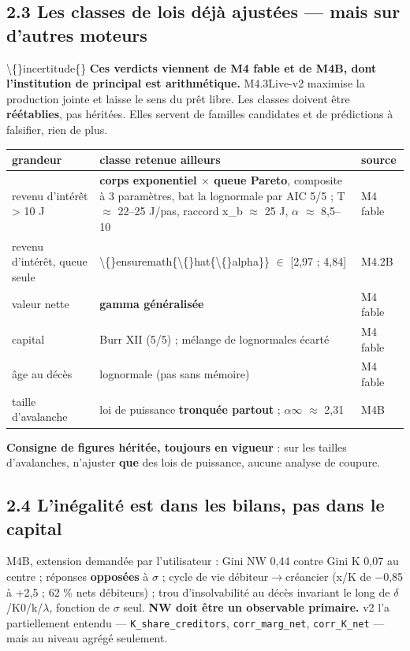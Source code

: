 \documentclass[11pt,a4paper]{article}
\newcommand{\code}[1]{\texttt{#1}}
\begin{document}
\subsection*{2.3 Les classes de lois déjà ajustées --- mais sur d'autres moteurs}

\textbackslash\{\}incertitude\{\} \textbf{Ces verdicts viennent de M4 fable et de M4B, dont l'institution de principal est arithmétique.} M4.3Live-v2 maximise la production jointe et laisse le sens du prêt libre. Les classes doivent être \textbf{réétablies}, pas héritées. Elles servent de familles candidates et de prédictions à falsifier, rien de plus.

\begin{center}
\begin{tabularx}{\linewidth}{@{}XXl@{}}
\toprule
\textbf{grandeur} & \textbf{classe retenue ailleurs} & \textbf{source} \\
\midrule
revenu d'intérêt > 10 J & \textbf{corps exponentiel \ensuremath{\times} queue Pareto}, composite à 3 paramètres, bat la lognormale par AIC 5/5 ; T \ensuremath{\approx} 22--25 J/pas, raccord x\_b \ensuremath{\approx} 25 J, \ensuremath{\alpha} \ensuremath{\approx} 8,5--10 & M4 fable \\
revenu d'intérêt, queue seule & \textbackslash\{\}ensuremath\{\textbackslash\{\}hat\{\textbackslash\{\}alpha\}\} \ensuremath{\in} [2,97 ; 4,84] & M4.2B \\
valeur nette & \textbf{gamma généralisée} & M4 fable \\
capital & Burr XII (5/5) ; mélange de lognormales écarté & M4 fable \\
âge au décès & lognormale (pas sans mémoire) & M4 fable \\
taille d'avalanche & loi de puissance \textbf{tronquée partout} ; \ensuremath{\alpha}\ensuremath{\infty} \ensuremath{\approx} 2,31 & M4B \\
\bottomrule
\end{tabularx}
\end{center}

\textbf{Consigne de figures héritée, toujours en vigueur} : sur les tailles d'avalanches, n'ajuster \textbf{que} des lois de puissance, aucune analyse de coupure.

\subsection*{2.4 L'inégalité est dans les bilans, pas dans le capital}

M4B, extension demandée par l'utilisateur : Gini NW 0,44 contre Gini K 0,07 au centre ; réponses \textbf{opposées} à \ensuremath{\sigma} ; cycle de vie débiteur\ensuremath{\rightarrow}créancier (x/K de \ensuremath{-}0,85 à +2,5 ; 62 \% nets débiteurs) ; trou d'insolvabilité au décès invariant le long de \ensuremath{\delta}/K0/k/\ensuremath{\lambda}, fonction de \ensuremath{\sigma} seul. \textbf{NW doit être un observable primaire.} v2 l'a partiellement entendu --- \code{K\_share\_creditors}, \code{corr\_marg\_net}, \code{corr\_K\_net} --- mais au niveau agrégé seulement.
\end{document}
